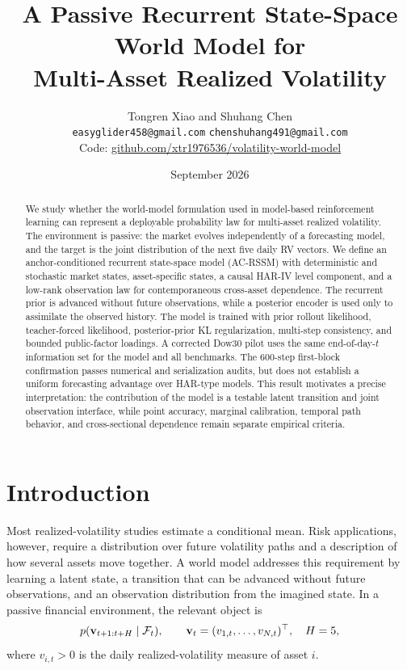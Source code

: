 \documentclass[11pt]{article}
\title{A Passive Recurrent State-Space World Model for\\Multi-Asset Realized Volatility}
\author{Tongren Xiao \quad and \quad Shuhang Chen\\[3pt]
\small \texttt{easyglider458@gmail.com} \quad \texttt{chenshuhang491@gmail.com}\\[-1pt]
\small Code: \href{https://github.com/xtr1976536/volatility-world-model}{github.com/xtr1976536/volatility-world-model}}
\date{September 2026}
\begin{document}
\maketitle

\begin{abstract}
We study whether the world-model formulation used in model-based reinforcement learning can represent a deployable probability law for multi-asset realized volatility. The environment is passive: the market evolves independently of a forecasting model, and the target is the joint distribution of the next five daily RV vectors. We define an anchor-conditioned recurrent state-space model (AC-RSSM) with deterministic and stochastic market states, asset-specific states, a causal HAR-IV level component, and a low-rank observation law for contemporaneous cross-asset dependence. The recurrent prior is advanced without future observations, while a posterior encoder is used only to assimilate the observed history. The model is trained with prior rollout likelihood, teacher-forced likelihood, posterior-prior KL regularization, multi-step consistency, and bounded public-factor loadings. A corrected Dow30 pilot uses the same end-of-day-$t$ information set for the model and all benchmarks. The 600-step first-block confirmation passes numerical and serialization audits, but does not establish a uniform forecasting advantage over HAR-type models. This result motivates a precise interpretation: the contribution of the model is a testable latent transition and joint observation interface, while point accuracy, marginal calibration, temporal path behavior, and cross-sectional dependence remain separate empirical criteria.
\end{abstract}

\section{Introduction}
Most realized-volatility studies estimate a conditional mean. Risk applications, however, require a distribution over future volatility paths and a description of how several assets move together. A world model addresses this requirement by learning a latent state, a transition that can be advanced without future observations, and an observation distribution from the imagined state. In a passive financial environment, the relevant object is
\begin{equation}
 p(\mathbf v_{t+1:t+H}\mid\mathcal F_t),\qquad \mathbf v_t=(v_{1,t},\ldots,v_{N,t})^\top,
 \quad H=5,
\end{equation}
where $v_{i,t}>0$ is the daily realized-volatility measure of asset $i$.
\end{document}
